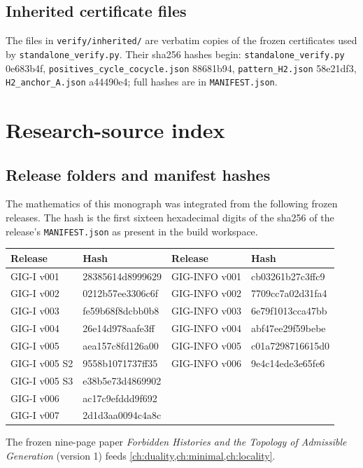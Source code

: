 \section{Inherited certificate files}
The files in \texttt{verify/inherited/} are verbatim copies of the frozen certificates used by \texttt{standalone\_verify.py}. Their sha256 hashes begin: \texttt{standalone\_verify.py} 0e683b4f, \texttt{positives\_cycle\_cocycle.json} 88681b94, \texttt{pattern\_H2.json} 58e21df3, \texttt{H2\_anchor\_A.json} a44490e4; full hashes are in \texttt{MANIFEST.json}.

\chapter{Research-source index}\label{app:sources}
\section{Release folders and manifest hashes}
The mathematics of this monograph was integrated from the following frozen releases. The hash is the first sixteen hexadecimal digits of the sha256 of the release's \texttt{MANIFEST.json} as present in the build workspace.
\begin{center}\footnotesize\setlength{\tabcolsep}{5pt}
\begin{tabular}{@{}llll@{}}\toprule Release & Hash & Release & Hash\\\midrule
GIG-I v001 & 28385614d8999629 & GIG-INFO v001 & cb03261b27c3ffc9\\
GIG-I v002 & 0212b57ee3306c6f & GIG-INFO v002 & 7709cc7a02d31fa4\\
GIG-I v003 & fe59b68f8dcbb0b8 & GIG-INFO v003 & 6e79f1013cca47bb\\
GIG-I v004 & 26e14d978aafe3ff & GIG-INFO v004 & abf47ee29f59bebe\\
GIG-I v005 & aea157c8fd126a00 & GIG-INFO v005 & c01a7298716615d0\\
GIG-I v005 S2 & 9558b1071737ff35 & GIG-INFO v006 & 9e4c14ede3e65fe6\\
GIG-I v005 S3 & e38b5e73d4869902 & & \\
GIG-I v006 & ac17c9efddd9f692 & & \\
GIG-I v007 & 2d1d3aa0094c4a8c & & \\
\bottomrule\end{tabular}\end{center}
The frozen nine-page paper \emph{Forbidden Histories and the Topology of Admissible Generation} (version 1) feeds \cref{ch:duality,ch:minimal,ch:locality}.

